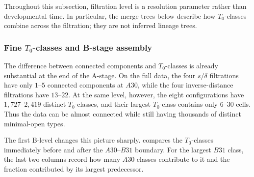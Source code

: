 \documentclass[a4paper,11pt]{article}
\theoremstyle{definition}
\theoremstyle{remark}
\begin{document}
Throughout this subsection, filtration level is a resolution parameter rather than developmental time. In particular, the merge trees below describe how $T_0$-classes combine across the filtration; they are not inferred lineage trees.

\subsubsection*{Fine $T_0$-classes and B-stage assembly}

The difference between connected components and $T_0$-classes is already substantial at the end of the A-stage. On the full data, the four $s/\delta$ filtrations have only $1$–$5$ connected components at $A30$, while the four inverse-distance filtrations have $13$–$22$. At the same level, however, the eight configurations have $1{,}727$–$2{,}419$ distinct $T_0$-classes, and their largest $T_0$-class contains only $6$–$30$ cells. Thus the data can be almost connected while still having thousands of distinct minimal-open types.

The first B-level changes this picture sharply.  compares the $T_0$-classes immediately before and after the $A30$–$B31$ boundary. For the largest $B31$ class, the last two columns record how many $A30$ classes contribute to it and the fraction contributed by its largest predecessor.
\end{document}
